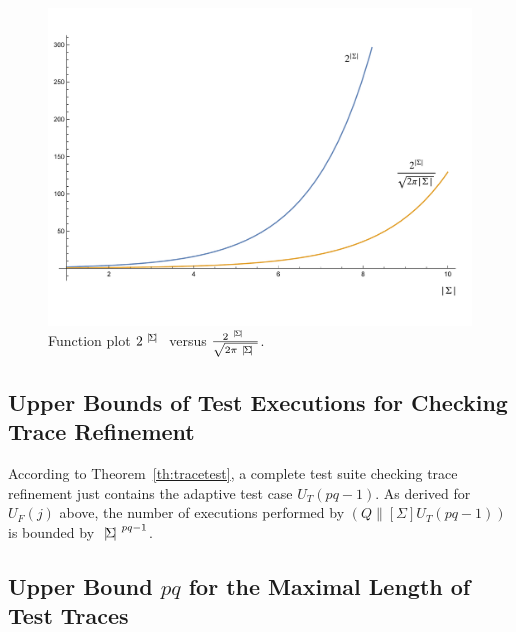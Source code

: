  
 
 
 \begin{figure}
 \begin{center}
\includegraphics[width=.8\textwidth]{minhit-fig.pdf}
\end{center}
\vspace*{-10mm}
\caption{Function plot $2^{{~|\! \Sigma\!|~}}$ versus $\frac{2^{~|\! \Sigma\!|~}}{\sqrt{2\pi {~|\! \Sigma\!|~}}}$.}
 \label{fig:minhita}
 \end{figure}

\subsection{Upper Bounds of Test Executions for Checking Trace Refinement}

According 
to Theorem~\ref{th:tracetest}, a complete test suite checking trace
refinement just contains the adaptive test case $U_T(pq-1)$. As derived for
$U_F(j)$ above, the number of executions performed by $(Q\parallel[\Sigma]
U_T(pq-1))$ is bounded by ${~|\! \Sigma\!|~}^{pq-1}$. 


\subsection{Upper Bound $pq$ for the Maximal Length of Test Traces}


